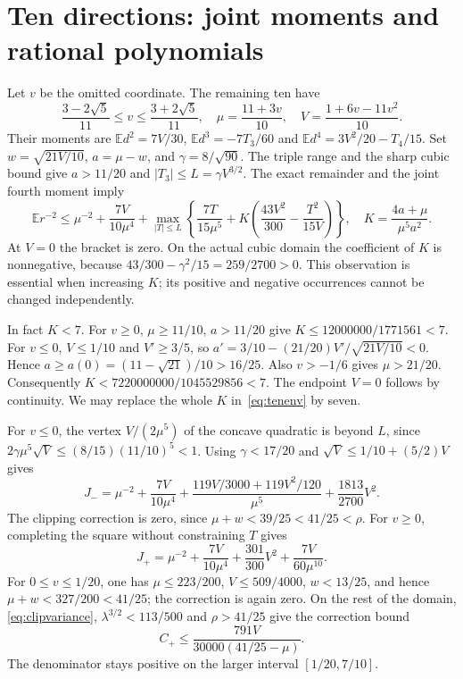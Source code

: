 \documentclass[11pt]{article}
\newcommand{\EE}{\mathbb E}
\begin{document}
\section{Ten directions: joint moments and rational polynomials}
Let $v$ be the omitted coordinate. The remaining ten have
\begin{equation}\label{eq:tenframe}
 \frac{3-2\sqrt5}{11}\le v\le\frac{3+2\sqrt5}{11},\quad
 \mu=\frac{11+3v}{10},\quad V=\frac{1+6v-11v^2}{10}.
\end{equation}
Their moments are
$\EE d^2=7V/30$, $\EE d^3=-7T_3/60$ and
$\EE d^4=3V^2/20-T_4/15$.
Set $w=\sqrt{21V/10}$, $a=\mu-w$, and
$\gamma=8/\sqrt{90}$. The triple range and the sharp cubic bound give
$a>11/20$ and $|T_3|\le L=\gamma V^{3/2}$.
The exact remainder and the joint fourth moment imply
\begin{equation}\label{eq:tenenv}
 \EE r^{-2}\le\mu^{-2}+\frac{7V}{10\mu^4}
 +\max_{|T|\le L}\left\{\frac{7T}{15\mu^5}
 +K\left(\frac{43V^2}{300}-\frac{T^2}{15V}\right)\right\},
 \quad K=\frac{4a+\mu}{\mu^5a^2}.
\end{equation}
At $V=0$ the bracket is zero. On the actual cubic domain the coefficient
of $K$ is nonnegative, because $43/300-\gamma^2/15=259/2700>0$.
This observation is essential when increasing $K$; its positive and
negative occurrences cannot be changed independently.

In fact $K<7$. For $v\ge0$, $\mu\ge11/10$, $a>11/20$ give
$K\le12000000/1771561<7$. For $v\le0$, $V\le1/10$ and
$V'\ge3/5$, so $a'=3/10-(21/20)V'/\sqrt{21V/10}<0$.
Hence $a\ge a(0)=(11-\sqrt{21})/10>16/25$.
Also $v>-1/6$ gives $\mu>21/20$. Consequently
$K<7220000000/1045529856<7$. The endpoint $V=0$ follows by
continuity. We may replace the whole $K$ in~\eqref{eq:tenenv} by seven.

For $v\le0$, the vertex $V/(2\mu^5)$ of the concave quadratic
is beyond $L$, since
$2\gamma\mu^5\sqrt V\le(8/15)(11/10)^5<1$.
Using $\gamma<17/20$ and $\sqrt V\le1/10+(5/2)V$ gives
\begin{equation}\label{eq:Jneg}
 J_- =\mu^{-2}+\frac{7V}{10\mu^4}
 +\frac{119V/3000+119V^2/120}{\mu^5}
 +\frac{1813}{2700}V^2.
\end{equation}
The clipping correction is zero, since
$\mu+w<39/25<41/25<\rho$.
For $v\ge0$, completing the square without constraining $T$ gives
\begin{equation}\label{eq:Jpos}
 J_+ =\mu^{-2}+\frac{7V}{10\mu^4}
       +\frac{301}{300}V^2+\frac{7V}{60\mu^{10}}.
\end{equation}
For $0\le v\le1/20$, one has $\mu\le223/200$,
$V\le509/4000$, $w<13/25$, and hence $\mu+w<327/200<41/25$;
the correction is again zero. On the rest of the domain,
\eqref{eq:clipvariance}, $\lambda^{3/2}<113/500$ and $\rho>41/25$
give the correction bound
\begin{equation}\label{eq:tencor}
 C_+\le\frac{791V}{30000(41/25-\mu)}.
\end{equation}
The denominator stays positive on the larger interval $[1/20,7/10]$.
\end{document}
